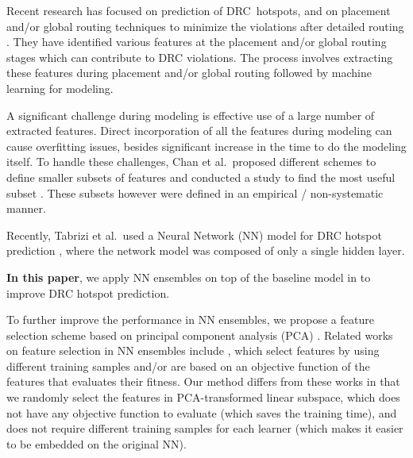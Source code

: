 \documentclass[10pt, final, letter, twocolumns]{IEEEtran}
\begin{document}
Recent research has focused on prediction of DRC\ hotspots, and on placement and/or global routing techniques to minimize the violations after detailed routing \cite{VLSIDAT17, DAC18, ISPD17}. They have  identified  various features at the placement and/or global routing stages which can contribute to DRC violations. The   process involves extracting these features during placement and/or global routing  followed by machine learning for modeling. 

A significant challenge during modeling is effective use of a large number of extracted features. Direct incorporation of all the features during modeling can cause overfitting issues, besides significant increase in the time to do the modeling itself. To handle these challenges,  Chan et al.\  proposed different schemes to define  smaller subsets of  features and conducted a study to find the most useful subset  \cite{ISPD17}. These subsets however were defined in an empirical / non-systematic manner.

Recently, Tabrizi et al.\ used a Neural Network (NN) model for DRC hotspot prediction \cite{DAC18}, where the network model was composed of only a single hidden layer. 

\textbf{In this paper}, we apply NN ensembles \cite{NNE90, NNE95, NNE02zhou} on top of the baseline model in \cite{DAC18} to improve DRC hotspot prediction. 


To further improve the performance in NN ensembles, we propose a feature selection scheme based on principal component analysis (PCA) \cite{PCA}. Related works on feature selection in NN ensembles include \cite{FS92ga, FS99opitz, FS00, FS10}, which select features by using different training samples and/or are based on an objective function of the features that evaluates their fitness. Our method differs from these works in that we randomly select the features in PCA-transformed linear subspace, which does not have any objective function to evaluate (which saves the training time), and does not require different training samples for each learner (which makes it easier to be embedded on the original NN).
\end{document}
